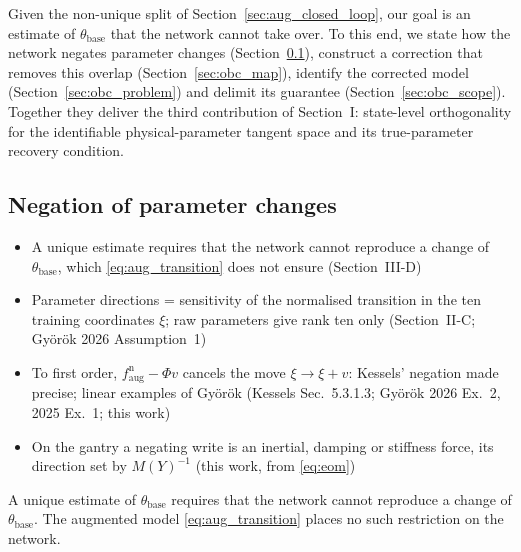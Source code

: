 Given the non-unique split of Section~\ref{sec:aug_closed_loop}, our goal is
an estimate of $\theta_{\mathrm{base}}$ that the network cannot take over.
To this end, we state how the network negates parameter changes
(Section~\ref{sec:obc_negation}), construct a correction that removes this
overlap (Section~\ref{sec:obc_map}), identify the corrected model
(Section~\ref{sec:obc_problem}) and delimit its guarantee
(Section~\ref{sec:obc_scope}).
Together they deliver the third contribution of Section~I: state-level
orthogonality for the identifiable physical-parameter tangent space and its
true-parameter recovery condition.

\subsection{Negation of parameter changes}\label{sec:obc_negation}
\ifdraft
\begin{itemize}
\item A unique estimate requires that the network cannot reproduce a change of $\theta_{\mathrm{base}}$, which \eqref{eq:aug_transition} does not ensure (Section~III-D)
\item Parameter directions = sensitivity of the normalised transition in the ten training coordinates $\xi$; raw parameters give rank ten only (Section~II-C; Gy\"or\"ok 2026 Assumption~1)
\item To first order, $f^{\mathrm n}_{\mathrm{aug}}-\Phi v$ cancels the move $\xi\to\xi+v$: Kessels' negation made precise; linear examples of Gy\"or\"ok (Kessels Sec.~5.3.1.3; Gy\"or\"ok 2026 Ex.~2, 2025 Ex.~1; this work)
\item On the gantry a negating write is an inertial, damping or stiffness force, its direction set by $M(Y)^{-1}$ (this work, from \eqref{eq:eom})
\end{itemize}
\fi

A unique estimate of $\theta_{\mathrm{base}}$ requires that the network cannot
reproduce a change of $\theta_{\mathrm{base}}$.
The augmented model \eqref{eq:aug_transition} places no such restriction on
the network.

